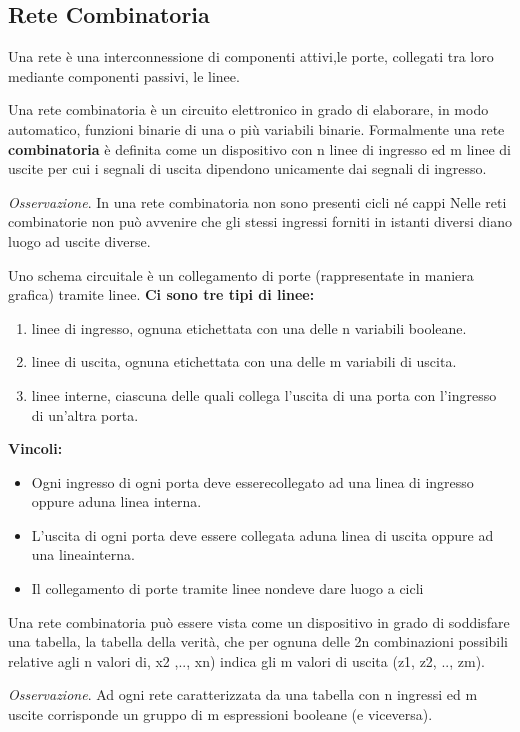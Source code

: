 \documentclass[12pt]{article}
\begin{document}
\subsection{Rete Combinatoria}
Una rete è una interconnessione di componenti attivi,le porte, collegati tra loro mediante componenti passivi, le linee. \par\medskip\noindent
Una rete combinatoria è un circuito elettronico in grado di elaborare, in modo automatico, funzioni binarie di una o più variabili binarie.
Formalmente una rete \textbf{combinatoria} è definita come un dispositivo con n linee di ingresso ed m linee di uscite per cui i segnali di uscita dipendono unicamente dai segnali di ingresso.\par\medskip\noindent
\textit{Osservazione}. In una rete combinatoria non sono presenti cicli né cappi Nelle reti combinatorie non può avvenire che gli stessi ingressi forniti in istanti diversi diano luogo ad uscite diverse. \par\medskip\noindent
Uno schema circuitale è un collegamento di porte (rappresentate in maniera grafica) tramite linee. \textbf{Ci sono tre tipi di linee:}
\begin{enumerate}
    \item linee di ingresso, ognuna etichettata con una delle n variabili booleane.
    \item linee di uscita, ognuna etichettata con una delle m variabili di uscita.
    \item linee interne, ciascuna delle quali collega l'uscita di una porta con l'ingresso di un'altra porta.
\end{enumerate}
\textbf{Vincoli:}
\begin{itemize}
    \item Ogni ingresso di ogni porta deve esserecollegato ad una linea di ingresso oppure aduna linea interna.
    \item  L'uscita di ogni porta deve essere collegata aduna linea di uscita oppure ad una lineainterna.
    \item Il collegamento di porte tramite linee nondeve dare luogo a cicli
\end{itemize}
\par\medskip\noindent
Una rete combinatoria può essere vista come un dispositivo in grado di soddisfare una tabella, la tabella della verità, che per ognuna delle 2n combinazioni possibili relative agli n valori di, x2
,.., xn) indica gli m valori di uscita (z1, z2, .., zm).\par\medskip\noindent
\textit{Osservazione}. Ad ogni rete caratterizzata da una tabella con n ingressi ed m uscite corrisponde un gruppo di m espressioni booleane (e viceversa).
\newpage
\end{document}
